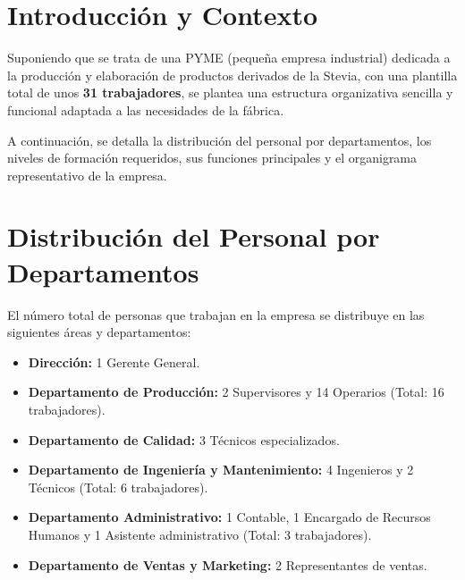 \section{Introducción y Contexto}
\begin{flushleft}
    Suponiendo que se trata de una PYME (pequeña empresa industrial) dedicada a la producción y elaboración de productos derivados de la Stevia, con una plantilla total de unos \textbf{31 trabajadores}, se plantea una estructura organizativa sencilla y funcional adaptada a las necesidades de la fábrica.
    \vspace{1em}

    A continuación, se detalla la distribución del personal por departamentos, los niveles de formación requeridos, sus funciones principales y el organigrama representativo de la empresa.
\end{flushleft}
\section{Distribución del Personal por Departamentos}

El número total de personas que trabajan en la empresa se distribuye en las siguientes áreas y departamentos:

\begin{itemize}
    \item \textbf{Dirección:} 1 Gerente General.
    \item \textbf{Departamento de Producción:} 2 Supervisores y 14 Operarios (Total: 16 trabajadores).
    \item \textbf{Departamento de Calidad:} 3 Técnicos especializados.
    \item \textbf{Departamento de Ingeniería y Mantenimiento:} 4 Ingenieros y 2 Técnicos (Total: 6 trabajadores).
    \item \textbf{Departamento Administrativo:} 1 Contable, 1 Encargado de Recursos Humanos y 1 Asistente administrativo (Total: 3 trabajadores).
    \item \textbf{Departamento de Ventas y Marketing:} 2 Representantes de ventas.
\end{itemize}

